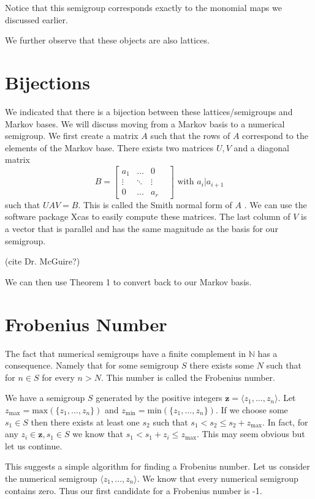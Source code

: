 \documentclass[11pt]{amsart}
\theoremstyle{plain}
\theoremstyle{definition}
\begin{document}
Notice that this semigroup corresponds exactly to the monomial maps we discussed earlier.

We further observe that these objects are also lattices.
\section{Bijections}
We indicated that there is a bijection between these lattices/semigroups and Markov bases. We will discuss moving from a Markov basis to a numerical semigroup. We first create a matrix $A$ such that the rows of $A$ correspond to the elements of the Markov base. There exists two matrices $U,V$ and a diagonal matrix
\[B=\left[\begin{array}{cccc}a_1&\dots&0\\\vdots&\ddots&\vdots\\0&\dots&a_r&\end{array}\right]\text{ with }a_i|a_{i+1}\]
such that $UAV=B$. This is called the Smith normal form of $A$ \cite{adkins}. We can use the software package Xcas to easily compute these matrices. The last column of $V$ is a vector that is parallel and has the same magnitude as the basis for our semigroup.

(cite Dr. McGuire?)

We can then use Theorem 1 to convert back to our Markov basis.
\section{Frobenius Number}
The fact that numerical semigroups have a finite complement in $\mathbb{N}$ has a consequence. Namely that for some semigroup $S$ there exists some $N$ such that for $n\in S$ for every  $n>N$. This number is called the Frobenius number.

We have a semigroup $S$ generated by the positive integers $\mathbf{z}=\langle z_1,\dots,z_n\rangle$. Let $z_\text{max}=\text{max}(\{z_1,\dots,z_n\})$ and $z_\text{min}=\text{min}(\{z_1,\dots,z_n\})$. If we choose some $s_1\in S$ then there exists at least one $s_2$ such that $s_1<s_2\le s_2+z_\text{max}$. In fact, for any $z_i\in \mathbf{z},s_1\in S$ we know that $s_1<s_1+z_i\le z_\text{max}$. This may seem obvious but let us continue.

This suggests a simple algorithm for finding a Frobenius number. Let us consider the numerical semigroup $\langle z_1,\dots,z_n\rangle$. We know that every numerical semigroup contains zero. Thus our first candidate for a Frobenius number is -1.
\end{document}
